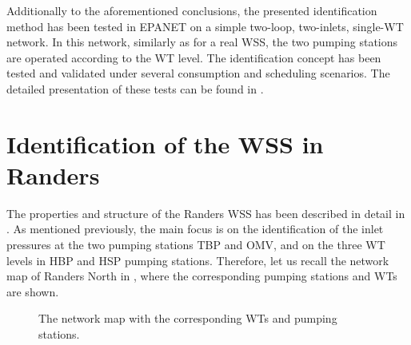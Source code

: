 Additionally to the aforementioned conclusions, the presented identification method has been tested in EPANET on a simple two-loop, two-inlets, single-WT network. In this network, similarly as for a real WSS, the two pumping stations are operated according to the WT level. The identification concept has been tested and validated under several consumption and scheduling scenarios. The detailed presentation of these tests can be found in . 



\newpage

\section{Identification of the WSS in Randers}
\label{identification_of_the_randers_WSS} 

The properties and structure of the Randers WSS has been described in detail in . As mentioned previously, the main focus is on the identification of the inlet pressures at the two pumping stations TBP and OMV, and on the three WT levels in HBP and HSP pumping stations. Therefore, let us recall the network map of Randers North in , where the corresponding pumping stations and WTs are shown.  

\begin{figure}[H]
\centering

\caption{The network map with the corresponding WTs and pumping stations.}
\label{fig:simplified_network_identification1223}
\end{figure}
\vspace{-3mm}

